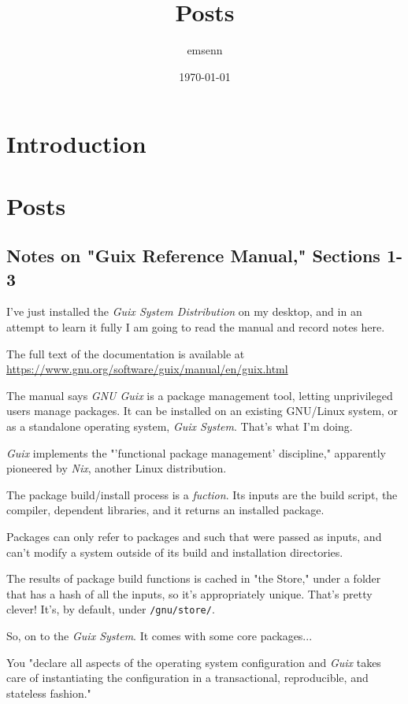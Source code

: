 \documentclass[11pt]{article}
\author{emsenn}
\date{\today}
\title{Posts}
\begin{document}
\maketitle
\setcounter{tocdepth}{2}
\tableofcontents
\section*{Introduction}
\label{sec:org69e80f3}
\section*{Posts}
\label{sec:orgce8e977}
\subsection*{Notes on "Guix Reference Manual," Sections 1-3}
\label{sec:orgd952f7b}
I've just installed the \emph{Guix System Distribution} on my desktop, and
in an attempt to learn it fully I am going to read the manual and
record notes here.

The full text of the documentation is available at
\url{https://www.gnu.org/software/guix/manual/en/guix.html}

The manual says \emph{GNU Guix} is a package management tool, letting
unprivileged users manage packages. It can be installed on an existing
GNU/Linux system, or as a standalone operating system, \emph{Guix System}.
That's what I'm doing.

\emph{Guix} implements the "'functional package management' discipline,"
apparently pioneered by \emph{Nix}, another Linux distribution.

The package build/install process is a \emph{fuction}. Its inputs are the
build script, the compiler, dependent libraries, and it returns an
installed package.

Packages can only refer to packages and such that were passed as
inputs, and can't modify a system outside of its build and
installation directories.

The results of package build functions is cached in "the Store," under
a folder that has a hash of all the inputs, so it's appropriately
unique. That's pretty clever! It's, by default, under \texttt{/gnu/store/}.

So, on to the \emph{Guix System}. It comes with some core packages...

You "declare all aspects of the operating system configuration and
\emph{Guix} takes care of instantiating the configuration in a
transactional, reproducible, and stateless fashion."
\end{document}
